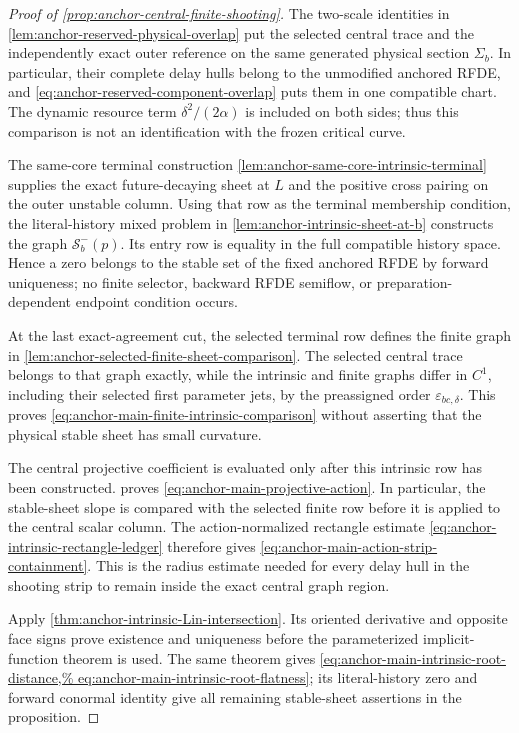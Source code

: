 \begin{proof}[Proof of \cref{prop:anchor-central-finite-shooting}]
The two-scale identities in
\cref{lem:anchor-reserved-physical-overlap} put the selected central trace
and the independently exact outer reference on the same generated physical
section \(\Sigma_b\).  In particular, their complete delay hulls belong to
the unmodified anchored RFDE, and
\cref{eq:anchor-reserved-component-overlap} puts them in one compatible
chart.  The
dynamic resource term \(\delta^2/(2\alpha)\) is included on both sides; thus
this comparison is not an identification with the frozen critical curve.

The same-core terminal construction
\cref{lem:anchor-same-core-intrinsic-terminal} supplies the exact
future-decaying sheet at \(L\) and the positive cross pairing on the outer
unstable column.  Using that row as the terminal membership condition, the
literal-history mixed problem in
\cref{lem:anchor-intrinsic-sheet-at-b} constructs the graph
\(\mathcal S_b^-(p)\).  Its entry row is equality in the full compatible
history space.  Hence a zero belongs to the stable set of the fixed anchored
RFDE by forward uniqueness; no finite selector, backward RFDE semiflow, or
preparation-dependent endpoint condition occurs.

At the last exact-agreement cut, the selected terminal row defines the
finite graph in \cref{lem:anchor-selected-finite-sheet-comparison}.  The
selected central trace belongs to that graph exactly, while the intrinsic
and finite graphs differ in \(C^1\), including their selected first
parameter jets, by the preassigned order
\(\varepsilon_{bc,\delta}\).  This proves
\cref{eq:anchor-main-finite-intrinsic-comparison} without asserting that
the physical stable sheet has small curvature.

The central projective coefficient is evaluated only after this intrinsic
row has been constructed.
 proves
\cref{eq:anchor-main-projective-action}.  In particular, the stable-sheet
slope is compared with the selected finite row before it is applied to the
central scalar column.  The action-normalized rectangle estimate
\cref{eq:anchor-intrinsic-rectangle-ledger} therefore gives
\cref{eq:anchor-main-action-strip-containment}.  This is the radius estimate
needed for every delay hull in the shooting strip to remain inside the exact
central graph region.

Apply \cref{thm:anchor-intrinsic-Lin-intersection}.  Its oriented derivative
and opposite face signs prove existence and uniqueness before the
parameterized implicit-function theorem is used.  The same theorem gives
\cref{eq:anchor-main-intrinsic-root-distance,%
eq:anchor-main-intrinsic-root-flatness}; its literal-history zero and forward
conormal identity give all remaining stable-sheet assertions in the
proposition.


\end{proof}
